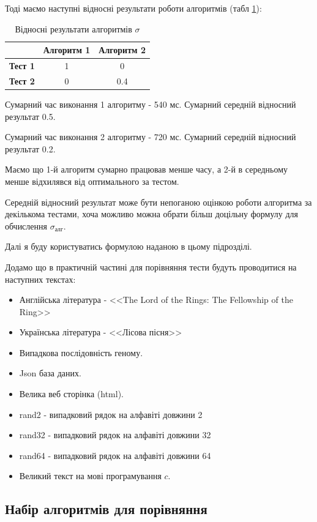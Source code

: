 \documentclass[a4paper,14pt]{extarticle} %
\begin{document}
	Тоді маємо наступні відносні результати роботи алгоритмів (табл \ref{table:relative_times}):
	\begin{table}[H]
		\centering
		\begin{tabular}{|c|c|c|}
			\hline
			& \textbf{Алгоритм 1} & \textbf{Алгоритм 2} \\ 
			\hline
			\textbf{Тест 1} & 1 & 0 \\ 
			\hline
			\textbf{Тест 2} & 0 & 0.4 \\ 
			\hline
		\end{tabular}
		\caption{Відносні результати алгоритмів $\sigma$}
		\label{table:relative_times}
	\end{table}

	Сумарний час виконання 1 алгоритму - 540 мс. Сумарний середній відносний результат 0.5.

	Сумарний час виконання 2 алгоритму - 720 мс. Сумарний середній відносний результат 0.2.

	Маємо що 1-й алгоритм сумарно працював менше часу, а 2-й в середньому менше відхилявся від оптимального за тестом.

	Середній відносний результат може бути непоганою оцінкою роботи алгоритма за декількома тестами, хоча можливо можна обрати більш доцільну формулу для обчислення $\sigma_{\text{алг}}$.

	Далі я буду користуватись формулою наданою в цьому підрозділі.

	Додамо що в практичній частині для порівняння тести будуть проводитися на наступних текстах:

	\begin{itemize}
		\item Англійська література - <<The Lord of the Rings: The Fellowship of the Ring>>
		\item Українська література - <<Лісова пісня>>
		\item Випадкова послідовність геному.
		\item Json база даних.
		\item Велика веб сторінка (html).
		\item rand2 - випадковий рядок на алфавіті довжини 2
		\item rand32 - випадковий рядок на алфавіті довжини 32
		\item rand64 - випадковий рядок на алфавіті довжини 64
		\item Великий текст на мові програмування $c$.
	\end{itemize}
	\subsection{Набір алгоритмів для порівняння}
\end{document}
